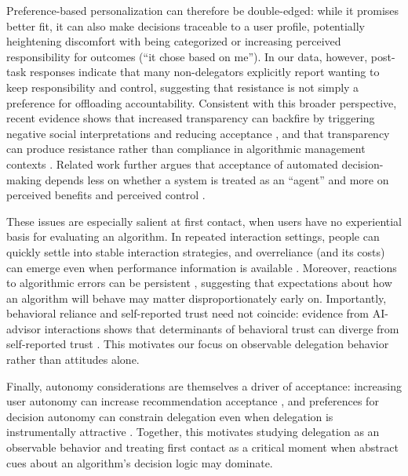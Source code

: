 \documentclass[a4paper, 12pt, fleqn]{article}
\theoremstyle{definition}
\begin{document}
Preference-based personalization can therefore be double-edged: while it promises better fit, it can also make decisions traceable to a user profile, potentially heightening discomfort with being categorized or increasing perceived responsibility for outcomes (``it chose based on me'').
In our data, however, post-task responses indicate that many non-delegators explicitly report wanting to keep responsibility and control, suggesting that resistance is not simply a preference for offloading accountability. Consistent with this broader perspective, recent evidence shows that increased transparency can backfire by triggering negative social interpretations and reducing acceptance \citep{Chen2024}, and that transparency can produce resistance rather than compliance in algorithmic management contexts \citep{Hu2024}. Related work further argues that acceptance of automated decision-making depends less on whether a system is treated as an ``agent'' and more on perceived benefits and perceived control \citep{Schaap2024}.

These issues are especially salient at first contact, when users have no experiential basis for evaluating an algorithm. In repeated interaction settings, people can quickly settle into stable interaction strategies, and overreliance (and its costs) can emerge even when performance information is available \citep{Klingbeil2024}. Moreover, reactions to algorithmic errors can be persistent \citep{Renier2021}, suggesting that expectations about how an algorithm will behave may matter disproportionately early on. Importantly, behavioral reliance and self-reported trust need not coincide: evidence from AI-advisor interactions shows that determinants of behavioral trust can diverge from self-reported trust \citep{Schreibelmayr2025}. This motivates our focus on observable delegation behavior rather than attitudes alone.

Finally, autonomy considerations are themselves a driver of acceptance: increasing user autonomy can increase recommendation acceptance \citep{Fink2024}, and preferences for decision autonomy can constrain delegation even when delegation is instrumentally attractive \citep{Ivanova-Stenzel2025}. Together, this motivates studying delegation as an observable behavior and treating first contact as a critical moment when abstract cues about an algorithm's decision logic may dominate.
\end{document}
